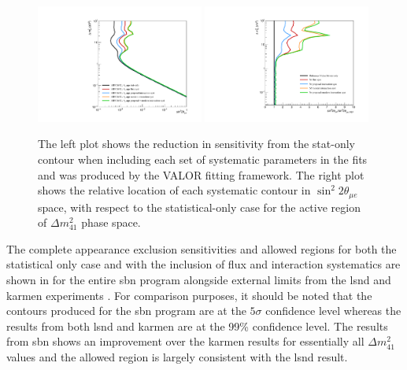 \begin{figure}[h!]
    \centering
    \includegraphics[width = 0.49\textwidth]{figures-chap6/exclusion_contours/nue_app_syst_groups.pdf}
    \includegraphics[width = 0.49\textwidth]{figures-chap6/exclusion_contours/nue_app_syst_groups_ratios.pdf}
    \caption[Impact of the different systematic parameter groups on the \nue appearance sensitivity.]{The left plot shows the reduction in sensitivity from the stat-only contour when including each set of systematic parameters in the fits and was produced by the VALOR fitting framework. The right plot shows the relative location of each systematic contour in $\sin^{2}2\theta_{\mu e}$ space, with respect to the statistical-only case for the active region of $\Delta m_{41}^{2}$ phase space.}
    \label{fig:nue_app_syst_group_sensitivities}
\end{figure}

The complete \nue appearance exclusion sensitivities and allowed regions for both the statistical only case and with the inclusion of flux and interaction systematics are shown in  for the entire \gls{sbn} program alongside external limits from the \gls{lsnd} and \gls{karmen} experiments \cite{LSND_KARMEN_nue_app_contour}. For comparison purposes, it should be noted that the contours produced for the \gls{sbn} program are at the $5\sigma$ confidence level whereas the results from both \gls{lsnd} and \gls{karmen} are at the 99\% confidence level. The results from \gls{sbn} shows an improvement over the \gls{karmen} results for essentially all $\Delta m^2_{41}$ values and the allowed region is largely consistent with the \gls{lsnd} result. 



